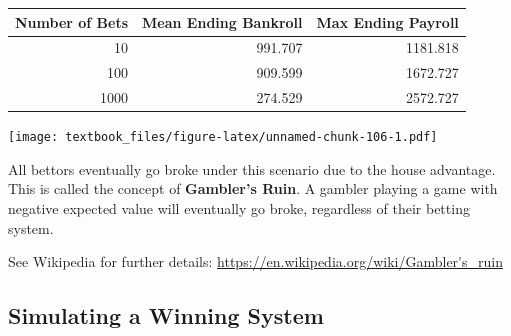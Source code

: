 \documentclass[
  11pt,
]{book}
\newenvironment{Shaded}{\begin{snugshade}}{\end{snugshade}}
\newcommand{\AttributeTok}[1]{\textcolor[rgb]{0.77,0.63,0.00}{#1}}
\newcommand{\DecValTok}[1]{\textcolor[rgb]{0.00,0.00,0.81}{#1}}
\newcommand{\FunctionTok}[1]{\textcolor[rgb]{0.00,0.00,0.00}{#1}}
\newcommand{\NormalTok}[1]{#1}
\newcommand{\OtherTok}[1]{\textcolor[rgb]{0.56,0.35,0.01}{#1}}
\newcommand{\SpecialCharTok}[1]{\textcolor[rgb]{0.00,0.00,0.00}{#1}}
\newcommand{\StringTok}[1]{\textcolor[rgb]{0.31,0.60,0.02}{#1}}
\theoremstyle{definition}
\theoremstyle{definition}
\theoremstyle{definition}
\theoremstyle{definition}
\theoremstyle{remark}
\begin{document}
\begin{Shaded}
\end{Shaded}

\newpage

\begin{table}[H]
\centering
\begin{tabular}{rrr}
\toprule
Number of Bets & Mean Ending Bankroll & Max Ending Payroll\\
\midrule
10 & 991.707 & 1181.818\\
100 & 909.599 & 1672.727\\
1000 & 274.529 & 2572.727\\
\bottomrule
\end{tabular}
\end{table}

\texttt{[image: textbook\_files/figure-latex/unnamed-chunk-106-1.pdf]}

All bettors eventually go broke under this scenario due to the house advantage. This is called the concept of \textbf{Gambler's Ruin}. A gambler playing a game with negative expected value will eventually go broke, regardless of their betting system.

See Wikipedia for further details: \url{https://en.wikipedia.org/wiki/Gambler's_ruin}

\vfill
\newpage

\hypertarget{simulating-a-winning-system}{%
\subsection{Simulating a Winning System}\label{simulating-a-winning-system}}
\end{document}
